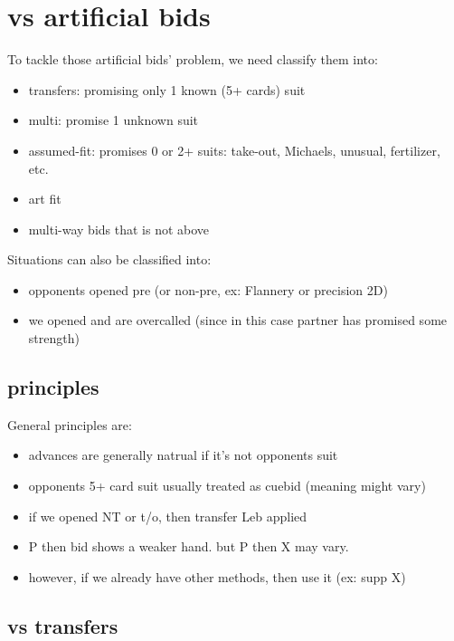 \section{vs artificial bids}

To tackle those artificial bids' problem, we need classify them into:

\begin{itemize}
    \setlength\itemsep{0pt}
    \item transfers: promising only 1 known (5+ cards) suit
    \item multi: promise 1 unknown suit
    \item assumed-fit: promises 0 or 2+ suits: take-out, Michaels, unusual, fertilizer, etc. 
    \item art fit
    \item multi-way bids that is not above 
\end{itemize}

Situations can also be classified into:

\begin{itemize}
    \setlength\itemsep{0pt}
    \item opponents opened pre (or non-pre, ex: Flannery or precision 2D)
    \item we opened and are overcalled (since in this case partner has promised some strength)
\end{itemize}

\subsection{principles}

General principles are:

\begin{itemize}
    \setlength\itemsep{0pt}
    \item advances are generally natrual if it's not opponents suit
    \item opponents 5+ card suit usually treated as cuebid (meaning might vary)
    \item if we opened NT or t/o, then transfer Leb applied
    \item P then bid shows a weaker hand. but P then X may vary.
    \item however, if we already have other methods, then use it (ex: supp X)
\end{itemize}

\subsection{vs transfers}

